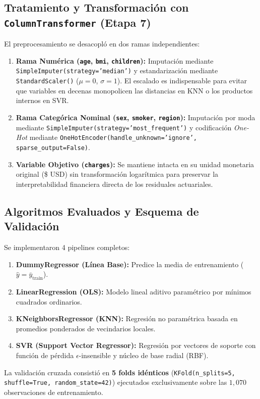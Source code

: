 \documentclass[11pt,a4paper]{article}
\begin{document}
\subsection{Tratamiento y Transformación con \texttt{ColumnTransformer} (Etapa 7)}
El preprocesamiento se desacopló en dos ramas independientes:
\begin{enumerate}[leftmargin=*]
    \item \textbf{Rama Numérica (\texttt{age}, \texttt{bmi}, \texttt{children}):} Imputación mediante \texttt{SimpleImputer(strategy='median')} y estandarización mediante \texttt{StandardScaler()} ($\mu = 0$, $\sigma = 1$). El escalado es indispensable para evitar que variables en decenas monopolicen las distancias en KNN o los productos internos en SVR.
    \item \textbf{Rama Categórica Nominal (\texttt{sex}, \texttt{smoker}, \texttt{region}):} Imputación por moda mediante \texttt{SimpleImputer(strategy='most\_frequent')} y codificación \textit{One-Hot} mediante \texttt{OneHotEncoder(handle\_unknown='ignore', sparse\_output=False)}.
    \item \textbf{Variable Objetivo (\texttt{charges}):} Se mantiene intacta en su unidad monetaria original (\$ USD) sin transformación logarítmica para preservar la interpretabilidad financiera directa de los residuales actuariales.
\end{enumerate}

\subsection{Algoritmos Evaluados y Esquema de Validación}
Se implementaron 4 pipelines completos:
\begin{enumerate}[leftmargin=*]
    \item \textbf{DummyRegressor (Línea Base):} Predice la media de entrenamiento ($\hat{y} = \bar{y}_{\text{train}}$).
    \item \textbf{LinearRegression (OLS):} Modelo lineal aditivo paramétrico por mínimos cuadrados ordinarios.
    \item \textbf{KNeighborsRegressor (KNN):} Regresión no paramétrica basada en promedios ponderados de vecindarios locales.
    \item \textbf{SVR (Support Vector Regressor):} Regresión por vectores de soporte con función de pérdida $\epsilon$-insensible y núcleo de base radial (RBF).
\end{enumerate}
La validación cruzada consistió en \textbf{5 folds idénticos} (\texttt{KFold(n\_splits=5, shuffle=True, random\_state=42)}) ejecutados exclusivamente sobre las $1,070$ observaciones de entrenamiento.
\end{document}
